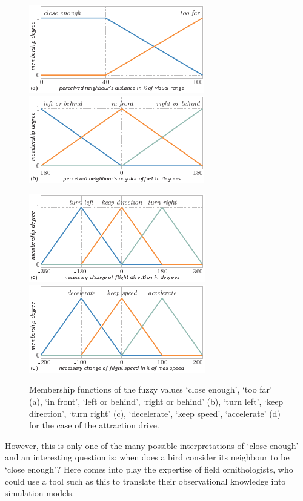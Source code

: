 \begin{figure}%
\null\vspace*{2mm}\par
\includegraphics{fig[attraction]a}\hspace*{2mm}\includegraphics{fig[attraction]b}
\par\vspace*{2mm}
\includegraphics{fig[attraction]c}\hspace*{2mm}\includegraphics{fig[attraction]d}
\par\vspace*{2mm}
\caption{Membership functions of the fuzzy values `close enough', `too far' (a), `in front', `left or behind', `right or behind' (b), `turn left', `keep direction', `turn right' (c), `decelerate', `keep speed', `accelerate' (d) for the case of the attraction drive.}
\label{fig:fuzzyAnimat:Da:afd}
\end{figure}
%
However, this is only one of the many possible interpretations of `close enough' and an interesting question is: when does a bird consider its neighbour to be `close enough'? Here comes into play the expertise of field ornithologists, who could use a tool such as this to translate their observational knowledge into simulation models.

